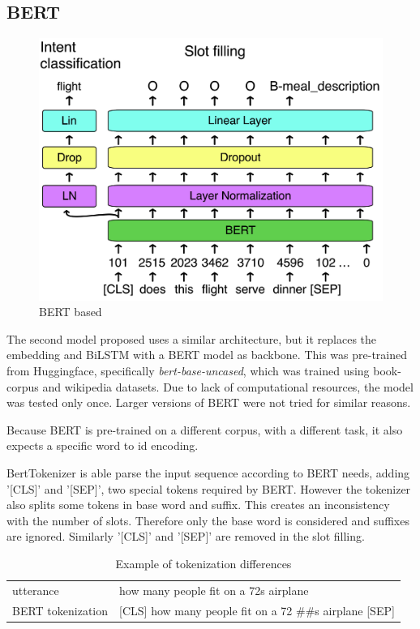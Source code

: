 \documentclass[a4paper]{article}
\begin{document}
\subsection{BERT}
\begin{figure}[h!]
	\centering
	\includegraphics[width=0.8\linewidth]{../assets/images/BERT}
	\caption{BERT based}
	\label{fig:bert}
\end{figure}
The second model proposed uses a similar architecture, but it replaces the embedding and BiLSTM with a BERT model as backbone. This was pre-trained from Huggingface, specifically \emph{bert-base-uncased}, which was trained using book-corpus and wikipedia datasets.  Due to lack of computational resources, the model was tested only once. Larger versions of BERT were not tried for similar reasons.

Because BERT is pre-trained on a different corpus, with a different task, it also expects a specific word to id encoding.

BertTokenizer is able parse the input sequence according to BERT needs, adding '[CLS]' and '[SEP]', two special tokens required by BERT. However the tokenizer also splits some tokens in base word and suffix. This creates an inconsistency with the number of slots. Therefore only the base word is considered and suffixes are ignored. Similarly '[CLS]' and '[SEP]' are removed in the slot filling. \\




\begin{table}[h!]
	\centering
		\begin{adjustbox}{max width=0.5\textwidth}
				\begin{tabular}{l|l}
					\hline
						utterance & how many people fit on a 72s airplane\\
						BERT tokenization & [CLS] how many people fit on a 72 \#\#s airplane [SEP]\\
						\hline
				\end{tabular}
			\end{adjustbox}
		\vspace*{2mm}
		\caption{Example of tokenization differences}
		\label{tab:tokenizer}
\end{table}
\end{document}
